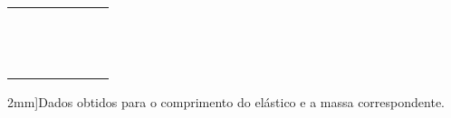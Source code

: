 \begin{table*}
\begin{center}
\begin{tabular}{lp{25mm}p{25mm}lp{25mm}p{25mm}l}
		& \cellcolor[gray]{0.89} & \cellcolor[gray]{0.92} & & \cellcolor[gray]{0.89} & \cellcolor[gray]{0.92} & \\
		& \cellcolor[gray]{0.95} & \cellcolor[gray]{0.97} & & \cellcolor[gray]{0.95} & \cellcolor[gray]{0.97} & \\
		& \cellcolor[gray]{0.89} & \cellcolor[gray]{0.92} & & \cellcolor[gray]{0.89} & \cellcolor[gray]{0.92} & \\
		& \cellcolor[gray]{0.95} & \cellcolor[gray]{0.97} & & \cellcolor[gray]{0.95} & \cellcolor[gray]{0.97} & \\
		& \cellcolor[gray]{0.89} & \cellcolor[gray]{0.92} & & \cellcolor[gray]{0.89} & \cellcolor[gray]{0.92} & \\
		& \cellcolor[gray]{0.95} & \cellcolor[gray]{0.97} & & \cellcolor[gray]{0.95} & \cellcolor[gray]{0.97} & \\
		& \cellcolor[gray]{0.89} & \cellcolor[gray]{0.92} & & \cellcolor[gray]{0.89} & \cellcolor[gray]{0.92} & \\
		& \cellcolor[gray]{0.95} & \cellcolor[gray]{0.97} & & \cellcolor[gray]{0.95} & \cellcolor[gray]{0.97} & \\
		& \cellcolor[gray]{0.89} & \cellcolor[gray]{0.92} & & \cellcolor[gray]{0.89} & \cellcolor[gray]{0.92} & \\
		& \cellcolor[gray]{0.95} & \cellcolor[gray]{0.97} & & \cellcolor[gray]{0.95} & \cellcolor[gray]{0.97} & \\
		& \cellcolor[gray]{0.89} & \cellcolor[gray]{0.92} & & \cellcolor[gray]{0.89} & \cellcolor[gray]{0.92} & \\
		& \cellcolor[gray]{0.95} & \cellcolor[gray]{0.97} & & \cellcolor[gray]{0.95} & \cellcolor[gray]{0.97} & \\
		& \cellcolor[gray]{0.89} & \cellcolor[gray]{0.92} & & \cellcolor[gray]{0.89} & \cellcolor[gray]{0.92} & \\
\bottomrule
		\end{tabular}
	\caption[][2mm]{Dados obtidos para o comprimento do elástico e a massa correspondente.}\label{Tab:CargaEDescargaCapacitor}
	\end{center}
\end{table*}


